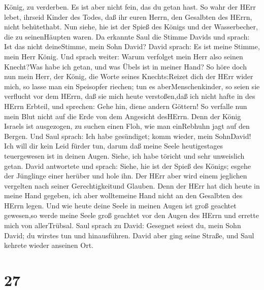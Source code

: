 König, zu verderben.  Es ist aber nicht fein, das du getan
hast. So wahr der HErr lebet, ihrseid Kinder des Todes, daß ihr euren
Herrn, den Gesalbten des HErrn, nicht behütethabt. Nun siehe, hie ist
der Spieß des Königs und der Wasserbecher, die zu seinenHäupten waren.
 Da erkannte Saul die Stimme Davids und sprach: Ist das
nicht deineStimme, mein Sohn David? David sprach: Es ist meine Stimme,
mein Herr König.  Und sprach weiter: Warum verfolget mein
Herr also seinen Knecht?Was habe ich getan, und was Übels ist in meiner
Hand?  So höre doch nun mein Herr, der König, die Worte
seines Knechts:Reizet dich der HErr wider mich, so lasse man ein
Speisopfer riechen; tun es aberMenschenkinder, so seien sie verflucht
vor dem HErrn, daß sie mich heute verstoßen,daß ich nicht hafte in des
HErrn Erbteil, und sprechen: Gehe hin, diene andern Göttern!
 So verfalle nun mein Blut nicht auf die Erde von dem
Angesicht desHErrn. Denn der König Israels ist ausgezogen, zu suchen
einen Floh, wie man einRebhuhn jagt auf den Bergen.  Und
Saul sprach: Ich habe gesündiget; komm wieder, mein SohnDavid! Ich will
dir kein Leid fürder tun, darum daß meine Seele heutigestages
teuergewesen ist in deinen Augen. Siehe, ich habe töricht und sehr
unweislich getan.  David antwortete und sprach: Siehe, hie
ist der Spieß des Königs; esgehe der Jünglinge einer herüber und hole
ihn.  Der HErr aber wird einem jeglichen vergelten nach
seiner Gerechtigkeitund Glauben. Denn der HErr hat dich heute in meine
Hand gegeben, ich aber wolltemeine Hand nicht an den Gesalbten des HErrn
legen.  Und wie heute deine Seele in meinen Augen ist groß
geachtet gewesen,so werde meine Seele groß geachtet vor den Augen des
HErrn und errette mich von allerTrübsal.  Saul sprach zu
David: Gesegnet seiest du, mein Sohn David; du wirstes tun und
hinausführen. David aber ging seine Straße, und Saul kehrete wieder
anseinen Ort.

\hypertarget{section-26}{%
\section{27}\label{section-26}}

